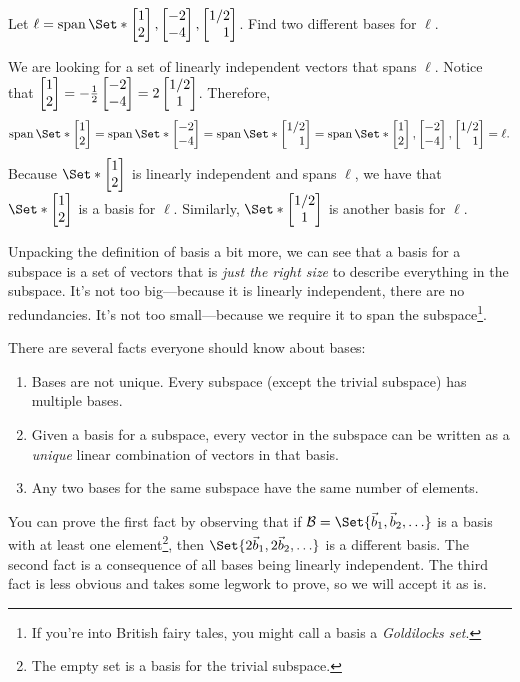 \begin{example}
	\label{EXLINEBASIS}
	Let $\ell=\Span\Set*{\mat{1\\2},\mat{-2\\-4}, \mat{1/2\\1}}$. Find
	two different bases for $\ell$.
	
	We are looking for a set of linearly independent vectors that spans $\ell$.
	Notice that $\mat{1\\2} = -\tfrac{1}{2}\mat{-2\\-4} = 2\matc{1/2\\1}$.
	Therefore,
    \[
		\Span\Set*{\mat{1\\2}} =
		\Span\Set*{\mat{-2\\-4}} =
		\Span\Set*{\mat{1/2\\1}} =
		\Span\Set*{\mat{1\\2},\mat{-2\\-4}, \mat{1/2\\1}} =
		\ell.
	\]
	Because $\Set*{\mat{1\\2}}$ is linearly independent and spans $\ell$,
	we have that $\Set*{\mat{1\\2}}$ is a basis for $\ell$.
	Similarly, $\Set*{\matc{1/2\\1}}$ is another basis for $\ell$.
\end{example}

Unpacking the definition of basis a bit more, we can see that 
a basis for a subspace
 is a set of vectors
that is \emph{just the right size} to describe everything in the subspace.
It's not too big---because it is linearly independent, there are no
redundancies. It's not too small---because we require it to span the subspace\footnote{ 
If you're into British fairy tales, you might call a basis a \emph{Goldilocks set}.
}.

There are several facts everyone should know about bases:
\begin{enumerate}
	\item Bases are not unique. Every subspace (except the trivial subspace)
		has multiple bases.
	\item Given a basis for a subspace, every vector in the subspace can be written
		as a \emph{unique} linear combination of vectors in that basis.
	\item Any two bases for the same subspace have the same number of elements.
\end{enumerate}

You can prove the first fact by observing that if $\mathcal B=\Set{\vec b_1,\vec b_2,\ldots}$ is a basis
with at least one element\footnote{ The empty set is a basis for the trivial subspace.}, then
$\Set{2\vec b_1,2\vec b_2,\ldots}$ is a different basis. The second fact is a consequence of all bases 
being linearly independent. The third fact is less obvious and takes some legwork to prove, so we will accept it
as is.

